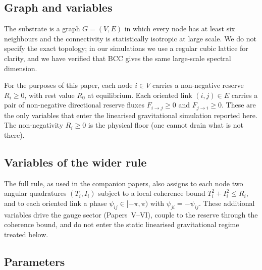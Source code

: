 \documentclass[11pt,a4paper]{article}
\begin{document}
\subsection{Graph and variables}

The substrate is a graph $G = (V, E)$ in which every node has
at least six neighbours and the connectivity is statistically
isotropic at large scale. We do not specify the exact topology;
in our simulations we use a regular cubic lattice for clarity,
and we have verified that BCC gives the same large-scale
spectral dimension.

For the purposes of this paper, each node $i \in V$ carries a
non-negative reserve $R_i \ge 0$, with rest value $R_0$ at
equilibrium. Each oriented link $(i, j) \in E$ carries a pair
of non-negative directional reserve fluxes $F_{i \to j} \ge 0$
and $F_{j \to i} \ge 0$. These are the only variables that
enter the linearised gravitational simulation reported here.
The non-negativity $R_i \ge 0$ is the physical floor (one
cannot drain what is not there).

\subsection*{Variables of the wider rule}

The full rule, as used in the companion papers, also assigns
to each node two angular quadratures $(T_i, I_i)$ subject to a
local coherence bound $T_i^2 + I_i^2 \le R_i$, and to each
oriented link a phase $\psi_{ij} \in [-\pi, \pi)$ with
$\psi_{ji} = -\psi_{ij}$. These additional variables drive the
gauge sector (Papers~V--VI), couple to the reserve through the
coherence bound, and do not enter the static linearised
gravitational regime treated below.

\subsection{Parameters}
\end{document}
